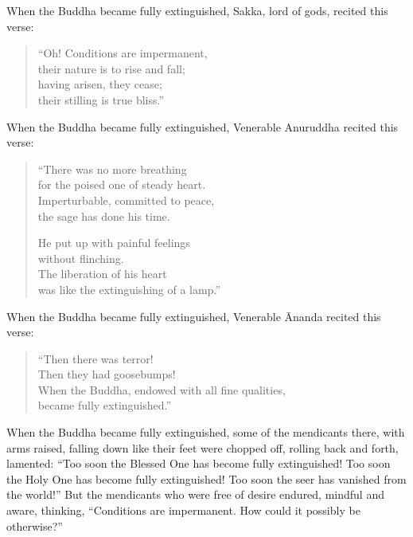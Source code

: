 \documentclass[12pt,openany]{book}%
\begin{document}
When the Buddha became fully extinguished, Sakka, lord of gods, recited this verse: 

\begin{verse}%
“Oh! Conditions are impermanent, \\
their nature is to rise and fall; \\
having arisen, they cease; \\
their stilling is true bliss.” 

%
\end{verse}

When the Buddha became fully extinguished, Venerable Anuruddha recited this verse: 

\begin{verse}%
“There was no more breathing \\
for the poised one of steady heart. \\
Imperturbable, committed to peace, \\
the sage has done his time. 

He put up with painful feelings \\
without flinching. \\
The liberation of his heart \\
was like the extinguishing of a lamp.” 

%
\end{verse}

When the Buddha became fully extinguished, Venerable Ānanda recited this verse: 

\begin{verse}%
“Then there was terror! \\
Then they had goosebumps! \\
When the Buddha, endowed with all fine qualities, \\
became fully extinguished.” 

%
\end{verse}

When the Buddha became fully extinguished, some of the mendicants there, with arms raised, falling down like their feet were chopped off, rolling back and forth, lamented: “Too soon the Blessed One has become fully extinguished! Too soon the Holy One has become fully extinguished! Too soon the seer has vanished from the world!” But the mendicants who were free of desire endured, mindful and aware, thinking, “Conditions are impermanent. How could it possibly be otherwise?” 
\end{document}
